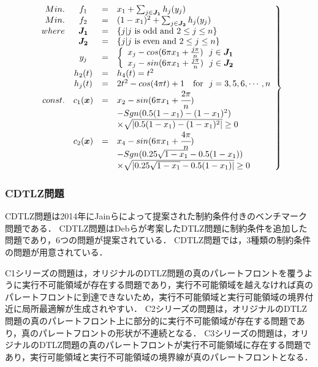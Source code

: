 \documentclass[../main/main]{subfiles}
\begin{document}
\begin{eqnarray} 
\left.
\begin{array}{rccl}
Min. & f_1 &=& x_1 + \sum_{j \in \bm{J_1}} h_j(y_j)\\
Min. & f_2 &=& (1 - x_1)^2 + \sum_{j \in \bm{J_2}} h_j(y_j)\\
where &  \bm{J_1} &=& \{j|j {\rm \ is \ odd \ and \ } 2 \leq j \leq n\}\\
           & \bm{J_2} &=& \{j|j {\rm \ is \ even \ and \ } 2 \leq j \leq n\}\\
           & y_j &=& \left\{ 
\begin{array}{l}
x_j - cos (6 \pi x_1 + \frac{j\pi}{n}) \ \ j \in \bm{J_1}\\
x_j - sin (6 \pi x_1 + \frac{j\pi}{n}) \ \ j \in \bm{J_2}\\
\end{array}
\right. \\
&h_2(t) &=& h_4(t) = t^2\\
&h_j(t) &=& 2t^2 - cos(4\pi t) + 1 \ \ \ {\rm for \ } \ j = 3,5,6, \cdots, n \\
const. & c_1(\bm x) &=& x_2 - sin(6 \pi x_1 + \cfrac{2\pi}{n}) \\
                        &&&      - Sgn(0.5(1-x_1) - (1-x_1)^2)\\
                        &&& \times \sqrt{|0.5(1-x_1) - (1-x_1)^2|} \geq 0\\
&    c_2(\bm x) & = &x_4 - sin(6\pi x_1 + \cfrac{4\pi}{n}) \\
                    &&& - Sgn(0.25\sqrt{1-x_1} - 0.5(1-x_1))\\
                    &&& \times \sqrt{|0.25 \sqrt{1-x_1} - 0.5(1-x_1)|} \geq 0\\
   \label{cf7_eq} 
\end{array}
\right\}
\end{eqnarray}

\newpage

\subsubsection{CDTLZ問題}
CDTLZ問題\cite{Jain2014Evolutionary2}は2014年にJainらによって提案された制約条件付きのベンチマーク問題である．
CDTLZ問題はDebらが考案したDTLZ問題に制約条件を追加した問題であり，6つの問題が提案されている．
CDTLZ問題では，3種類の制約条件の問題が用意されている．

C1シリーズの問題は，オリジナルのDTLZ問題の真のパレートフロントを覆うように実行不可能領域が存在する問題であり，実行不可能領域を越えなければ真のパレートフロントに到達できないため，実行不可能領域と実行可能領域の境界付近に局所最適解が生成されやすい．
C2シリーズの問題は，オリジナルのDTLZ問題の真のパレートフロント上に部分的に実行不可能領域が存在する問題であり，真のパレートフロントの形状が不連続となる．
C3シリーズの問題は，オリジナルのDTLZ問題の真のパレートフロントが実行不可能領域に存在する問題であり，実行可能領域と実行不可能領域の境界線が真のパレートフロントとなる．
\end{document}
